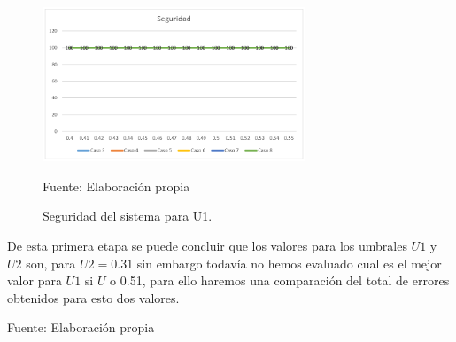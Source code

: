 \begin{figure}[H]
\begin{center}
\includegraphics[width=0.7\textwidth]{Imagenes/Cap4/image004}
\end{center}
\begin{center}
\vskip -0.5cm
\caption{\small{Seguridad del sistema para U1.}}
\label{fig:figura4.4}
{\small{Fuente: Elaboración propia}}
\end{center}
\end{figure}

De esta primera etapa se puede concluir que los valores para los umbrales $U1$ y $U2$ son, para $U2 = 0.31$ sin embargo todavía no hemos evaluado cual es el mejor valor para $U1$ si $U$ o 0.51, para ello haremos una comparación del total de errores obtenidos para esto dos valores.

\begin{center}
\begin{table}[H]
\centering
\caption{\small{Comparación de numero de errores entre U1 = U y U1 = 0.51.}}
\label{table:tabla4.17}
\vskip 0.2cm
\begin{center}
\vskip 0.2cm
{\small{Fuente: Elaboración propia}}
\end{center}
\end{table}
\end{center}

